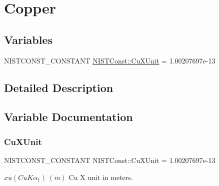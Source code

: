 \hypertarget{group___n_i_s_t_const-_copper}{}\section{Copper}
\label{group___n_i_s_t_const-_copper}
\subsection*{Variables}
\begin{DoxyCompactItemize}
\item 
N\+I\+S\+T\+C\+O\+N\+S\+T\+\_\+\+C\+O\+N\+S\+T\+A\+NT \mbox{\hyperlink{group___n_i_s_t_const-_copper_ga22d8010195e8b2c21fc1be6ae608c139}{N\+I\+S\+T\+Const\+::\+Cu\+X\+Unit}} = 1.\+00207697e-\/13
\end{DoxyCompactItemize}


\subsection{Detailed Description}


\subsection{Variable Documentation}
\mbox{\label{group___n_i_s_t_const-_copper_ga22d8010195e8b2c21fc1be6ae608c139}} 
\subsubsection{\texorpdfstring{Cu\+X\+Unit}{CuXUnit}}
{\footnotesize\ttfamily N\+I\+S\+T\+C\+O\+N\+S\+T\+\_\+\+C\+O\+N\+S\+T\+A\+NT N\+I\+S\+T\+Const\+::\+Cu\+X\+Unit = 1.\+00207697e-\/13}

$xu(CuK\alpha_1) \ (m)$ Cu X unit in meters. 